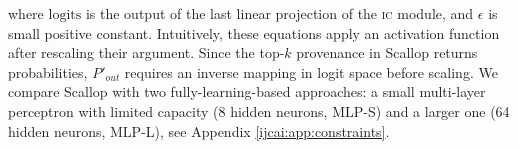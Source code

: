 where $\mathrm{logits}$ is the output of the last linear projection of the \textsc{ic} module, and $\epsilon$ is small positive constant. Intuitively, these equations apply an activation function after rescaling their argument. Since the top-$k$ provenance in Scallop returns probabilities, $P'_{out}$ requires an inverse mapping in logit space before scaling.
 
\fi
%
We compare Scallop with two fully-learning-based approaches: a small multi-layer perceptron with limited capacity (8 hidden neurons, MLP-S) and a larger one (64 hidden neurons, MLP-L), see Appendix \ref{ijcai:app:constraints}.

